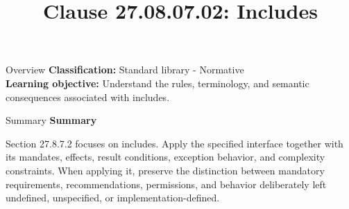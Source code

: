 \documentclass[10pt,letterpaper]{article}
\title{Clause 27.08.07.02: Includes}
\author{}
\date{}
\begin{document}
\maketitle
\begin{CornellOverviewBox}{Overview}
\textbf{Classification:} Standard library - Normative\\[2pt]
\textbf{Learning objective:} Understand the rules, terminology, and semantic consequences associated with includes.
\end{CornellOverviewBox}\begin{CornellSummaryBox}{Summary}
{\sffamily\bfseries\color{Accent} Summary}\par\vspace{3pt}Section 27.8.7.2 focuses on includes. Apply the specified interface together with its mandates, effects, result conditions, exception behavior, and complexity constraints. When applying it, preserve the distinction between mandatory requirements, recommendations, permissions, and behavior deliberately left undefined, unspecified, or implementation-defined.
\end{CornellSummaryBox}
\end{document}
